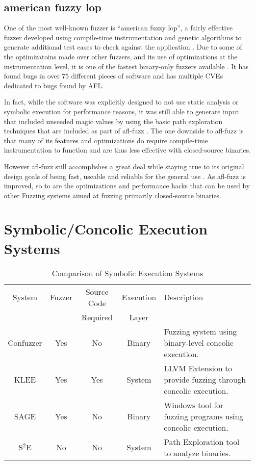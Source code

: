 \subsection{american fuzzy lop}
One of the most well-known fuzzer is ``american fuzzy lop'', a fairly effective
fuzzer developed using compile-time instrumentation and genetic algorithms to
generate additional test cases to check against the application \cite{afl}. Due
to some of the optimizatoins made over other fuzzers, and its use of
optimizations at the instrumentation level, it is one of the fastest binary-only
fuzzers available \cite{afldesign}. It has found bugs in over $75$ different
pieces of software and has multiple CVEs dedicated to bugs found by AFL.

In fact, while the software was explicitly designed to not use static analysis
or symbolic execution for performance reasons, it was still able to generate
input that included unseeded magic values by using the basic path exploration
techniques that are included as part of afl-fuzz \cite{aflsymbol}. The one
downside to afl-fuzz is that many of its features and optimizations do require
compile-time instrumentation to function and are thus less effective with
closed-source binaries.

However afl-fuzz still accomplishes a great deal while staying true to its
original design goals of being fast, useable and reliable for the general use
\cite{aflhistory}. As afl-fuzz is improved, so to are the optimizations and
performance hacks that can be used by other Fuzzing systems aimed at fuzzing
primarily closed-source binaries.

\section{Symbolic/Concolic Execution Systems}
\begin{table}
\begin{tabular}{| c | c | c | c | p{6cm} |}
\hline
System & Fuzzer & Source Code & Execution & Description\\
& & Required & Layer &\\\hline
Confuzzer & Yes & No & Binary & Fuzzing system using binary-level concolic execution.\\
KLEE & Yes & Yes & System & LLVM Extension to provide fuzzing through concolic
execution.\\
SAGE & Yes & No & Binary & Windows tool for fuzzing programs using concolic
execution.\\
S$^2$E & No & No & System & Path Exploration tool to analyze binaries.\\
\hline
\end{tabular}
\caption{Comparison of Symbolic Execution Systems}
\label{table:othersys}
\end{table}

